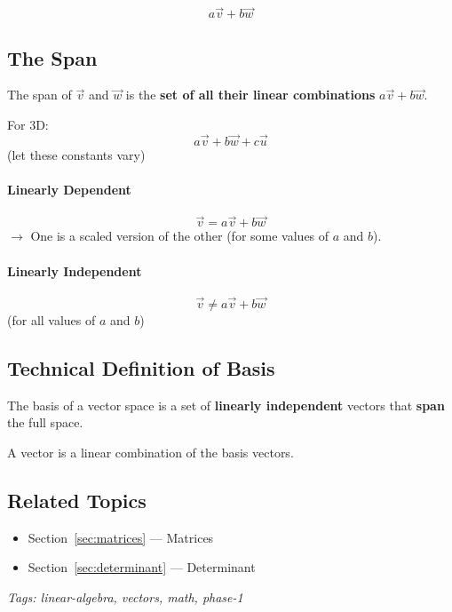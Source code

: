 \[
a\vec{v} + b\vec{w}
\]

\subsection{The Span}
\begin{defbox}
The span of $\vec{v}$ and $\vec{w}$ is the \textbf{set of all their linear combinations} $a\vec{v} + b\vec{w}$.
\end{defbox}

For 3D:
\[
a\vec{v} + b\vec{w} + c\vec{u}
\]
(let these constants vary)

\paragraph{Linearly Dependent}
\[
\vec{v} = a\vec{v} + b\vec{w}
\]
$\rightarrow$ One is a scaled version of the other (for some values of $a$ and $b$).

\paragraph{Linearly Independent}
\[
\vec{v} \neq a\vec{v} + b\vec{w}
\]
(for all values of $a$ and $b$)

\subsection{Technical Definition of Basis}
\begin{defbox}
The basis of a vector space is a set of \textbf{linearly independent} vectors that \textbf{span} the full space.
\end{defbox}

\begin{notebox}
A vector is a linear combination of the basis vectors.
\end{notebox}

\subsection*{Related Topics}
\begin{itemize}[nosep]
  \item Section~\ref{sec:matrices} --- Matrices
  \item Section~\ref{sec:determinant} --- Determinant
\end{itemize}

\bigskip
\noindent\textit{Tags: linear-algebra, vectors, math, phase-1}
